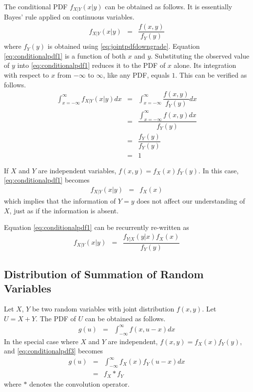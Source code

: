 The conditional PDF $f_{X|Y}(x|y)$ can be obtained as follows. It is essentially Bayes' rule applied on continuous variables.
\begin{eqnarray}
	f_{X|Y}(x|y) &=& \dfrac{f(x, y)}{f_Y(y)} \label{eq:conditionalpdf1}
\end{eqnarray}
where $f_Y(y)$ is obtained using \eqref{eq:jointpdfdowngrade}. Equation \eqref{eq:conditionalpdf1} is a function of both $x$ and $y$. Substituting the observed value of $y$ into \eqref{eq:conditionalpdf1} reduces it to the PDF of $x$ alone. Its integration with respect to $x$ from $-\infty$ to $\infty$, like any PDF, equals $1$. This can be verified as follows.
\begin{eqnarray}
	\int_{x=-\infty}^{\infty}f_{X|Y}(x|y)dx &=& \int_{x=-\infty}^{\infty}\dfrac{f(x, y)}{f_Y(y)}dx \nonumber \\
	&=& \dfrac{\int_{x=-\infty}^{\infty}f(x, y)dx}{f_Y(y)} \nonumber \\
	&=& \dfrac{f_Y(y)}{f_Y(y)} \nonumber \\
	&=& 1 \nonumber
\end{eqnarray}

If $X$ and $Y$ are independent variables, $f(x,y) = f_X(x)f_Y(y)$. In this case, \eqref{eq:conditionalpdf1} becomes
\begin{eqnarray}
	f_{X|Y}(x|y) &=& f_X(x) \nonumber
\end{eqnarray}
which implies that the information of $Y=y$ does not affect our understanding of $X$, just as if the information is absent.

Equation \eqref{eq:conditionalpdf1} can be recurrently re-written as
\begin{eqnarray}
	f_{X|Y}(x|y) &=& \dfrac{f_{Y|X}(y|x)f_X(x)}{f_Y(y)} \label{eq:conditionalpdf1a}
\end{eqnarray}

\subsection{Distribution of Summation of Random Variables}

Let $X$, $Y$ be two random variables with joint distribution $f(x, y)$. Let $U=X+Y$. The PDF of $U$ can be obtained as follows.
\begin{eqnarray}
	g(u) &=& \int_{-\infty}^{\infty} f(x, u-x)dx \label{eq:conditionalpdf3}
\end{eqnarray}
In the special case where $X$ and $Y$ are independent, $f(x, y) = f_X(x)f_Y(y)$, and \eqref{eq:conditionalpdf3} becomes
\begin{eqnarray}
	g(u) &=& \int_{-\infty}^{\infty} f_X(x)f_Y(u-x)dx \nonumber \\
	&=& f_X * f_Y \nonumber
\end{eqnarray}
where $*$ denotes the convolution operator.

